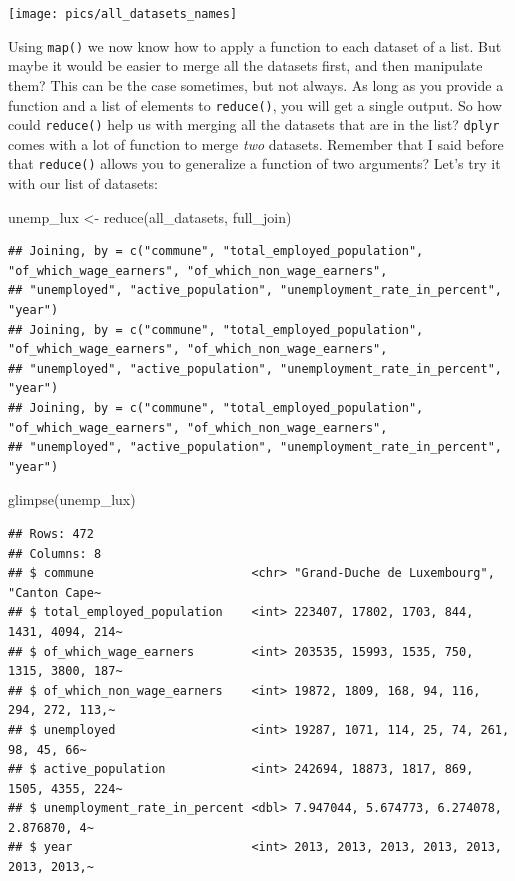 \documentclass[
]{article}
\newenvironment{Shaded}{\begin{snugshade}}{\end{snugshade}}
\newcommand{\FunctionTok}[1]{\textcolor[rgb]{0.00,0.00,0.00}{#1}}
\newcommand{\NormalTok}[1]{#1}
\newcommand{\OtherTok}[1]{\textcolor[rgb]{0.56,0.35,0.01}{#1}}
\begin{document}
\texttt{[image: pics/all\_datasets\_names]}

Using \texttt{map()} we now know how to apply a function to each dataset of a list. But maybe it would be
easier to merge all the datasets first, and then manipulate them? This can be the case sometimes,
but not always.
As long as you provide a function and a list of elements to \texttt{reduce()}, you will get a single
output. So how could \texttt{reduce()} help us with merging all the datasets that are in the list? \texttt{dplyr}
comes with a lot of function to merge \emph{two} datasets. Remember that I said before that \texttt{reduce()}
allows you to generalize a function of two arguments? Let's try it with our list of datasets:

\begin{Shaded}
\begin{Highlighting}[]
\NormalTok{unemp\_lux }\OtherTok{\textless{}{-}} \FunctionTok{reduce}\NormalTok{(all\_datasets, full\_join)}
\end{Highlighting}
\end{Shaded}

\begin{verbatim}
## Joining, by = c("commune", "total_employed_population", "of_which_wage_earners", "of_which_non_wage_earners",
## "unemployed", "active_population", "unemployment_rate_in_percent", "year")
## Joining, by = c("commune", "total_employed_population", "of_which_wage_earners", "of_which_non_wage_earners",
## "unemployed", "active_population", "unemployment_rate_in_percent", "year")
## Joining, by = c("commune", "total_employed_population", "of_which_wage_earners", "of_which_non_wage_earners",
## "unemployed", "active_population", "unemployment_rate_in_percent", "year")
\end{verbatim}

\begin{Shaded}
\begin{Highlighting}[]
\FunctionTok{glimpse}\NormalTok{(unemp\_lux)}
\end{Highlighting}
\end{Shaded}

\begin{verbatim}
## Rows: 472
## Columns: 8
## $ commune                      <chr> "Grand-Duche de Luxembourg", "Canton Cape~
## $ total_employed_population    <int> 223407, 17802, 1703, 844, 1431, 4094, 214~
## $ of_which_wage_earners        <int> 203535, 15993, 1535, 750, 1315, 3800, 187~
## $ of_which_non_wage_earners    <int> 19872, 1809, 168, 94, 116, 294, 272, 113,~
## $ unemployed                   <int> 19287, 1071, 114, 25, 74, 261, 98, 45, 66~
## $ active_population            <int> 242694, 18873, 1817, 869, 1505, 4355, 224~
## $ unemployment_rate_in_percent <dbl> 7.947044, 5.674773, 6.274078, 2.876870, 4~
## $ year                         <int> 2013, 2013, 2013, 2013, 2013, 2013, 2013,~
\end{verbatim}
\end{document}
